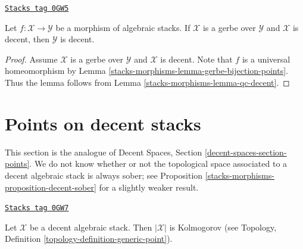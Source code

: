 \begin{lemma}
\label{stacks-morphisms-lemma-gerbe-decent}
\href{https://stacks.math.columbia.edu/tag/0GW5}{\texttt{Stacks tag 0GW5}}

Let $f : \mathcal{X} \to \mathcal{Y}$ be a morphism of algebraic stacks.
If $\mathcal{X}$ is a gerbe over $\mathcal{Y}$ and $\mathcal{X}$ is decent,
then $\mathcal{Y}$ is decent.
\end{lemma}

\begin{proof}
Assume $\mathcal{X}$ is a gerbe over $\mathcal{Y}$ and $\mathcal{X}$ is decent.
Note that $f$ is a universal homeomorphism by
Lemma \ref{stacks-morphisms-lemma-gerbe-bijection-points}.
Thus the lemma follows from Lemma \ref{stacks-morphisms-lemma-qc-decent}.
\end{proof}

\section{Points on decent stacks}
\label{stacks-morphisms-section-points-decent}
This section is the analogue of Decent Spaces, Section
\ref{decent-spaces-section-points}.
We do not know whether or not the topological space associated
to a decent algebraic stack is always sober; see
Proposition \ref{stacks-morphisms-proposition-decent-sober} for a slightly weaker result.

\begin{lemma}[Kolmogorov]
\label{stacks-morphisms-lemma-kolmogorov}
\href{https://stacks.math.columbia.edu/tag/0GW7}{\texttt{Stacks tag 0GW7}}

Let $\mathcal{X}$ be a decent algebraic stack.
Then $|\mathcal{X}|$ is Kolmogorov (see
Topology, Definition \ref{topology-definition-generic-point}).
\end{lemma}

